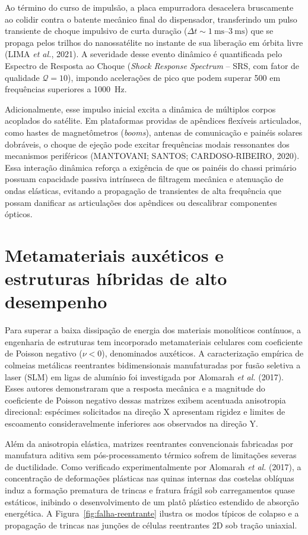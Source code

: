 Ao término do curso de impulsão, a placa empurradora desacelera bruscamente ao colidir contra o batente mecânico final do dispensador, transferindo um pulso transiente de choque impulsivo de curta duração ($\Delta t \sim \SIrange{1}{3}{\milli\second}$) que se propaga pelos trilhos do nanossatélite no instante de sua liberação em órbita livre (LIMA \textit{et al.}, 2021). A severidade desse evento dinâmico é quantificada pelo Espectro de Resposta ao Choque (\textit{Shock Response Spectrum} -- SRS, com fator de qualidade $\mathcal{Q} = 10$), impondo acelerações de pico que podem superar \SI{500}{\gacc} em frequências superiores a \SI{1000}{\hertz}.

Adicionalmente, esse impulso inicial excita a dinâmica de múltiplos corpos acoplados do satélite. Em plataformas providas de apêndices flexíveis articulados, como hastes de magnetômetros (\textit{booms}), antenas de comunicação e painéis solares dobráveis, o choque de ejeção pode excitar frequências modais ressonantes dos mecanismos periféricos (MANTOVANI; SANTOS; CARDOSO-RIBEIRO, 2020). Essa interação dinâmica reforça a exigência de que os painéis do chassi primário possuam capacidade passiva intrínseca de filtragem mecânica e atenuação de ondas elásticas, evitando a propagação de transientes de alta frequência que possam danificar as articulações dos apêndices ou descalibrar componentes ópticos.

\section{Metamateriais auxéticos e estruturas híbridas de alto desempenho}
\label{sec:auxeticos}

Para superar a baixa dissipação de energia dos materiais monolíticos contínuos, a engenharia de estruturas tem incorporado metamateriais celulares com coeficiente de Poisson negativo ($\nu < 0$), denominados auxéticos. A caracterização empírica de colmeias metálicas reentrantes bidimensionais manufaturadas por fusão seletiva a laser (SLM) em ligas de alumínio foi investigada por Alomarah \textit{et al.} (2017). Esses autores demonstraram que a resposta mecânica e a magnitude do coeficiente de Poisson negativo dessas matrizes exibem acentuada anisotropia direcional: espécimes solicitados na direção X apresentam rigidez e limites de escoamento consideravelmente inferiores aos observados na direção Y.

Além da anisotropia elástica, matrizes reentrantes convencionais fabricadas por manufatura aditiva sem pós-processamento térmico sofrem de limitações severas de ductilidade. Como verificado experimentalmente por Alomarah \textit{et al.} (2017), a concentração de deformações plásticas nas quinas internas das costelas oblíquas induz a formação prematura de trincas e fratura frágil sob carregamentos quase estáticos, inibindo o desenvolvimento de um platô plástico estendido de absorção energética. A Figura~\ref{fig:falha-reentrante} ilustra os modos típicos de colapso e a propagação de trincas nas junções de células reentrantes 2D sob tração uniaxial.

